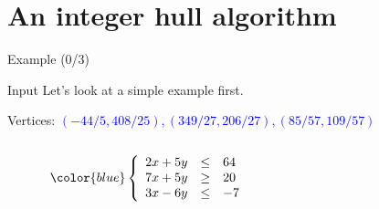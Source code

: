 \section{An integer hull algorithm}
\begin{frame}{Example (0/3)}
	\begin{block}{Input}
		Let's look at a simple example first.
		
		Vertices: \textcolor{blue}{$(-44/5,408/25),(349/27,206/27),(85/57,109/57)$}
		\begin{columns}
			\begin{column}{0.2\textwidth}
				\begin{center}
					\begin{equation*}
						\color{blue}
						\left\{   \begin{array}{crl}
							2x + 5y &\le& 64\\ 
							7x + 5y &\ge& 20\\
							3x - 6y &\le& -7
						\end{array}
						\right.
					\end{equation*}
					\smallskip
					
					
				\end{center}
				
			\end{column}
			\hfill
			\begin{column}{0.8\textwidth}
				\begin{center}
					\begin{figure}[H]
						\scalebox{.7}{}
					\end{figure}
					
				\end{center}
				
			\end{column}
		\end{columns}
		
	\end{block}
	
	
\end{frame}
